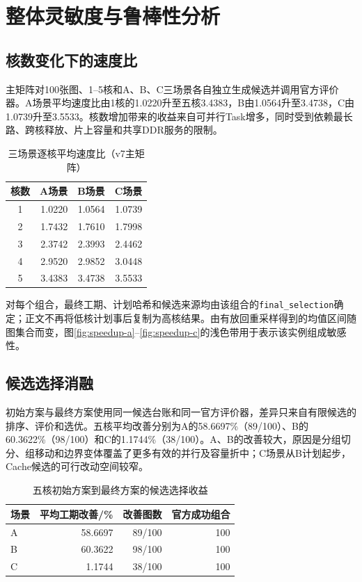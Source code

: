 \section{整体灵敏度与鲁棒性分析}
\label{sec:overall-sensitivity}

\subsection{核数变化下的速度比}
主矩阵对100张图、1--5核和A、B、C三场景各自独立生成候选并调用官方评价器。A场景平均速度比由1核的1.0220升至五核3.4383，B由1.0564升至3.4738，C由1.0739升至3.5533。核数增加带来的收益来自可并行Task增多，同时受到依赖最长路、跨核释放、片上容量和共享DDR服务的限制。

\begin{table}[H]\centering\small
\caption{三场景逐核平均速度比（v7主矩阵）}\label{tab:overall-speedup-v7}
\begin{tabular}{c rrr}\toprule
核数 & A场景 & B场景 & C场景\\\midrule
1 & 1.0220 & 1.0564 & 1.0739\\
2 & 1.7432 & 1.7610 & 1.7998\\
3 & 2.3742 & 2.3993 & 2.4462\\
4 & 2.9520 & 2.9852 & 3.0448\\
5 & 3.4383 & 3.4738 & 3.5533\\\bottomrule
\end{tabular}
\end{table}

对每个组合，最终工期、计划哈希和候选来源均由该组合的\texttt{final\_selection}确定；正文不再将低核计划事后复制为高核结果。由有放回重采样得到的均值区间随图集合而变，图\ref{fig:speedup-a}--\ref{fig:speedup-c}的浅色带用于表示该实例组成敏感性。

\subsection{候选选择消融}
初始方案与最终方案使用同一候选台账和同一官方评价器，差异只来自有限候选的排序、评价和选优。五核平均改善分别为A的58.6697\%（89/100）、B的60.3622\%（98/100）和C的1.1744\%（38/100）。A、B的改善较大，原因是分组切分、组移动和边界变体覆盖了更多有效的并行及容量折中；C场景从B计划起步，Cache候选的可行改动空间较窄。

\begin{table}[H]\centering\small
\caption{五核初始方案到最终方案的候选选择收益}\label{tab:overall-ablation-v7}
\begin{tabular}{lrrr}\toprule
场景 & 平均工期改善/\% & 改善图数 & 官方成功组合\\\midrule
A & 58.6697 & 89/100 & 100\\
B & 60.3622 & 98/100 & 100\\
C & 1.1744 & 38/100 & 100\\\bottomrule
\end{tabular}
\end{table}

